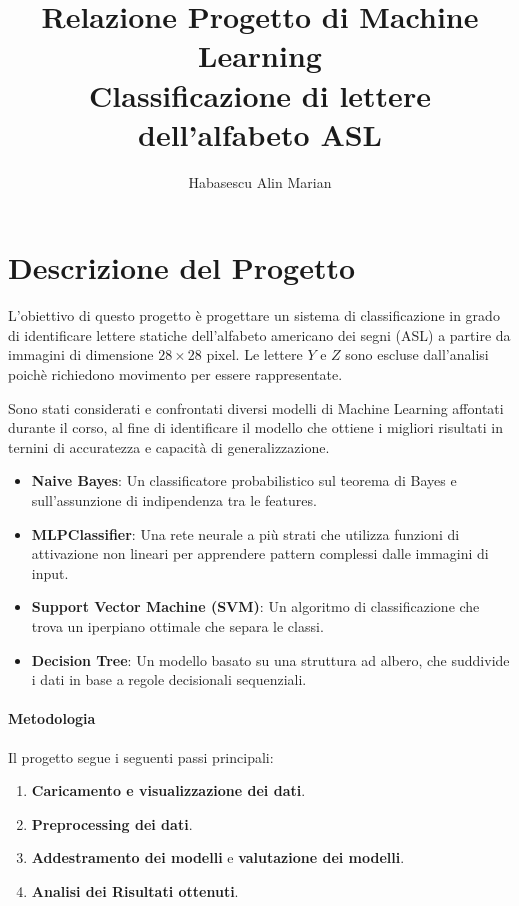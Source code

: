 \documentclass{article}
\title{Relazione Progetto di Machine Learning \\Classificazione di lettere dell'alfabeto ASL}
\author{Habasescu Alin Marian}
\begin{document}
\maketitle

\tableofcontents
\clearpage

\section{Descrizione del Progetto}

L'obiettivo di questo progetto è progettare un sistema di classificazione in 
grado di identificare lettere statiche dell'alfabeto americano dei segni (ASL) a partire da immagini 
di dimensione \(28\times28\) pixel. Le lettere \(Y\) e \(Z\) sono escluse dall'analisi poichè 
richiedono movimento per essere rappresentate. 

Sono stati considerati e confrontati diversi modelli di Machine Learning affontati durante il corso, al fine 
di identificare il modello che ottiene i migliori risultati in ternini di accuratezza e capacità di generalizzazione.

\begin{itemize}


    \item \textbf{Naive Bayes}: Un classificatore probabilistico sul teorema di Bayes e sull'assunzione
    di indipendenza tra le features.
    \item \textbf{MLPClassifier}: Una rete neurale a più strati che utilizza funzioni di attivazione 
    non lineari per apprendere pattern complessi dalle immagini di input.
    \item \textbf{Support Vector Machine (SVM)}: Un algoritmo di classificazione che trova un iperpiano 
    ottimale che separa le classi. 
    \item \textbf{Decision Tree}: Un modello basato su una struttura ad albero, che suddivide i dati in 
    base a regole decisionali sequenziali. 
\end{itemize}

\paragraph{Metodologia}
Il progetto segue i seguenti passi principali: 
\begin{enumerate}
    \item  \textbf{Caricamento e visualizzazione dei dati}.
    \item  \textbf{Preprocessing dei dati}.
    \item  \textbf{Addestramento dei modelli} e \textbf{valutazione dei modelli}.
    \item  \textbf{Analisi dei Risultati ottenuti}.
\end{enumerate}
\end{document}

